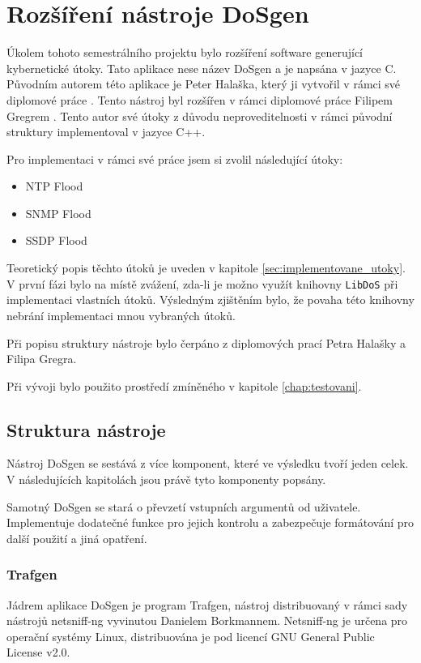 \chapter{Rozšíření nástroje DoSgen}
Úkolem tohoto semestrálního projektu bylo rozšíření software generující kybernetické útoky. Tato aplikace nese název DoSgen a je napsána v jazyce C. Původním autorem této aplikace je Peter Halaška, který ji vytvořil v rámci své diplomové práce \cite{Halaska2016}. Tento nástroj byl rozšířen v rámci diplomové práce Filipem Gregrem \cite{Gregr2017}. Tento autor své útoky z důvodu neproveditelnosti v rámci původní struktury implementoval v jazyce C++.

Pro implementaci v rámci své práce jsem si zvolil následující útoky:
\begin{itemize}
	\item{NTP Flood}
	\item{SNMP Flood}
	\item{SSDP Flood}
\end{itemize}

Teoretický popis těchto útoků je uveden v kapitole \ref{sec:implementovane_utoky}. V první fázi bylo na místě zvážení, zda-li je možno využít knihovny \texttt{LibDoS} při implementaci vlastních útoků. Výsledným zjištěním bylo, že povaha této knihovny nebrání implementaci mnou vybraných útoků.

Při popisu struktury nástroje bylo čerpáno z diplomových prací Petra Halašky a Filipa Gregra.

Při vývoji bylo použito prostředí zmíněného v kapitole \ref{chap:testovani}.

\section{Struktura nástroje}
Nástroj DoSgen se sestává z více komponent, které ve výsledku tvoří jeden celek. V následujících kapitolách jsou právě tyto komponenty popsány.

Samotný DoSgen se stará o převzetí vstupních argumentů od uživatele. Implementuje dodatečné funkce pro jejich kontrolu a zabezpečuje formátování pro další použití a jiná opatření.

\subsection{Trafgen}
Jádrem aplikace DoSgen je program Trafgen, nástroj distribuovaný v rámci sady nástrojů netsniff-ng vyvinutou Danielem Borkmannem. Netsniff-ng je určena pro operační systémy Linux, distribuována je pod licencí GNU General Public License v2.0.

